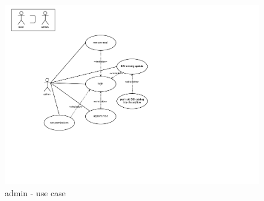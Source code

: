 \begin{figure}[h] 
    \centering
    \includegraphics[scale=1.0]{Pictures/Admin}
    \caption{admin - use case}
\end{figure}

